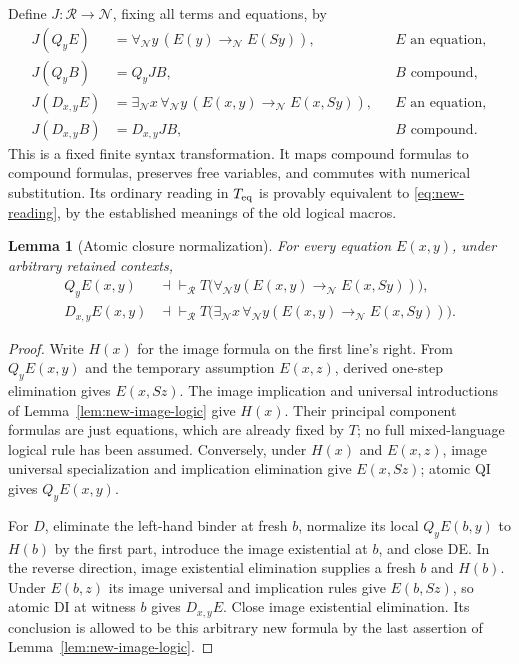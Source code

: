 \documentclass[11pt,a4paper]{article}
\newtheorem{lemma}[theorem]{Lemma}
\theoremstyle{definition}
\begin{document}
Define $J:\mathcal R\to\mathcal N$, fixing all terms and equations, by
\begin{equation}
 \begin{aligned}
 J(Q_yE)&=\forall_{\mathcal N}y\,
                (E(y)\to_{\mathcal N}E(Sy)),
                    &&E\text{ an equation},\\
 J(Q_yB)&=Q_yJB,     &&B\text{ compound},\\
 J(D_{x,y}E)&=\exists_{\mathcal N}x\,
             \forall_{\mathcal N}y\,
                (E(x,y)\to_{\mathcal N}E(x,Sy)),
                    &&E\text{ an equation},\\
 J(D_{x,y}B)&=D_{x,y}JB,&&B\text{ compound}.
 \end{aligned}
 \label{eq:new-J}
\end{equation}
This is a fixed finite syntax transformation.  It maps compound formulas to
compound formulas, preserves free variables, and commutes with numerical
substitution.  Its ordinary reading in $T_{\rm eq}$ is provably equivalent to
\eqref{eq:new-reading}, by the established meanings of the old logical macros.

\begin{lemma}[Atomic closure normalization]
\label{lem:new-atomic-normalization}
For every equation $E(x,y)$, under arbitrary retained contexts,
\begin{equation}
 \begin{aligned}
 Q_yE(x,y)&\dashv\vdash_{\mathcal R}
       T\bigl(\forall_{\mathcal N}y
           (E(x,y)\to_{\mathcal N}E(x,Sy))\bigr),\\
 D_{x,y}E(x,y)&\dashv\vdash_{\mathcal R}
       T\bigl(\exists_{\mathcal N}x\,
             \forall_{\mathcal N}y
           (E(x,y)\to_{\mathcal N}E(x,Sy))\bigr).
 \end{aligned}
 \label{eq:new-atomic-normalization}
\end{equation}
\end{lemma}
\begin{proof}
Write $H(x)$ for the image formula on the first line's right.
From $Q_yE(x,y)$ and the temporary assumption $E(x,z)$, derived one-step
elimination gives $E(x,Sz)$.  The image implication and universal
introductions of Lemma~\ref{lem:new-image-logic} give $H(x)$.  Their
principal component formulas are just equations, which are already fixed
by $T$; no full mixed-language logical rule has been assumed.
Conversely, under $H(x)$ and $E(x,z)$, image universal specialization and
implication elimination give $E(x,Sz)$; atomic QI gives $Q_yE(x,y)$.

For $D$, eliminate the left-hand binder at fresh $b$, normalize its local
$Q_yE(b,y)$ to $H(b)$ by the first part, introduce the image existential
at $b$, and close DE.  In the reverse direction, image existential
elimination supplies a fresh $b$ and $H(b)$.  Under $E(b,z)$ its image
universal and implication rules give $E(b,Sz)$, so atomic DI at witness
$b$ gives $D_{x,y}E$.  Close image existential elimination.  Its conclusion
is allowed to be this arbitrary new formula by the last assertion of
Lemma~\ref{lem:new-image-logic}.
\end{proof}
\end{document}
